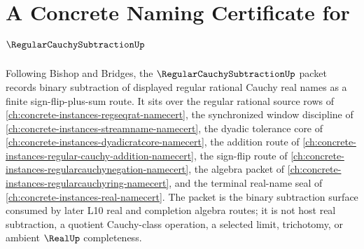 \chapter{A Concrete Naming Certificate for $\RegularCauchySubtractionUp$}
\label{ch:concrete-instances-regular-cauchy-subtraction-namecert}

Following Bishop and Bridges, the $\RegularCauchySubtractionUp$ packet records binary subtraction of displayed regular rational Cauchy real names as a finite sign-flip-plus-sum route. It sits over the regular rational source rows of \autoref{ch:concrete-instances-regseqrat-namecert}, the synchronized window discipline of \autoref{ch:concrete-instances-streamname-namecert}, the dyadic tolerance core of \autoref{ch:concrete-instances-dyadicratcore-namecert}, the addition route of \autoref{ch:concrete-instances-regular-cauchy-addition-namecert}, the sign-flip route of \autoref{ch:concrete-instances-regularcauchynegation-namecert}, the algebra packet of \autoref{ch:concrete-instances-regularcauchyring-namecert}, and the terminal real-name seal of \autoref{ch:concrete-instances-real-namecert}. The packet is the binary subtraction surface consumed by later L10 real and completion algebra routes; it is not host real subtraction, a quotient Cauchy-class operation, a selected limit, trichotomy, or ambient $\RealUp$ completeness.

